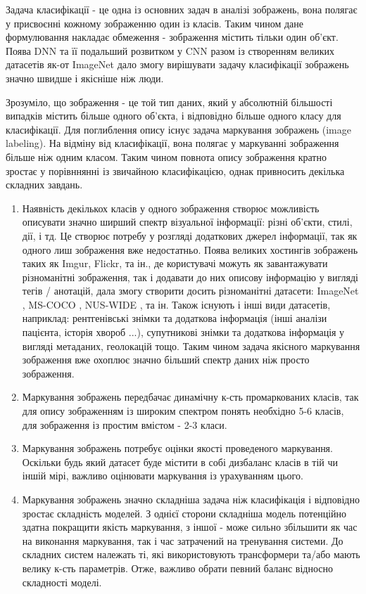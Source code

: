 \documentclass{udstu}
\begin{document}
Задача класифікації - це одна із основних задач в аналізі зображень, вона полягає
у присвоєнні кожному зображенню один із класів. Таким чином дане формулювання накладає
обмеження - зображення містить тільки один об'єкт. Поява DNN \cite{dnn-cls}
та її подальший розвитком у CNN \cite{cnn-cls-1,cnn-cls-2} разом із створенням
великих датасетів як-от ImageNet \cite{deng2009imagenet} дало змогу вирішувати задачу
класифікації зображень значно швидше і якісніше ніж люди.

Зрозуміло, що зображення - це той тип даних, який у абсолютній більшості випадків містить більше одного об'єкта,
і відповідно більше одного класу для класифікації.
Для поглиблення опису існує задача маркування зображень (image labeling).
На відміну від класифікації, вона полягає у маркуванні зображення більше ніж одним класом.
Таким чином повнота опису зображення кратно зростає у порівннянні із звичайною класифікацією,
однак привносить декілька складних завдань.

\begin{enumerate}[1)]
	\item Наявність декількох класів у одного зображення створює можливість
описувати значно ширший спектр візуальної інформації: різні об'єкти, стилі, дії, і тд.
Це створює потребу у розгляді додаткових джерел інформації, так як одного лиш зображення вже недостатньо.
Поява великих хостингів зображень таких як Imgur, Flickr, та ін., де користувачі можуть
як завантажувати різноманітні зображення, так і додавати до них описову інформацію у вигляді
тегів / анотацій, дала змогу створити досить різноманітні датасети: ImageNet \cite{deng2009imagenet},
MS-COCO \cite{cocodataset}, NUS-WIDE \cite{nus-wide-civr09}, та ін. Також існують і інші види датасетів,
наприклад: рентгенівські знімки та додаткова інформація (інші аналізи пацієнта, історія хвороб ...),
супутникові знімки та додаткова інформація у вигляді метаданих, геолокацій тощо.
Таким чином задача якісного маркування зображення вже охоплює значно більший спектр даних ніж просто
зображення.

	\item Маркування зображень передбачає динамічну к-сть промаркованих класів,
так для опису зображенням із широким спектром понять необхідно 5-6 класів,
для зображення із простим вмістом - 2-3 класи.

	\item Маркування зображень потребує оцінки якості проведеного маркування. Оскільки будь який
датасет буде містити в собі дизбаланс класів в тій чи іншій мірі, важливо оцінювати маркування із
урахуванням цього.

	\item Маркування зображень значно складніша задача ніж класифікація і відповідно зростає
складність моделей. З однієї сторони складніша модель потенційно здатна покращити якість маркування,
з іншої - може сильно збільшити як час на виконання маркування, так і час затрачений на тренування системи.
До складних систем належать ті, які використовують трансформери та/або мають велику к-сть параметрів.
Отже, важливо обрати певний баланс відносно складності моделі.
\end{enumerate}
\end{document}
